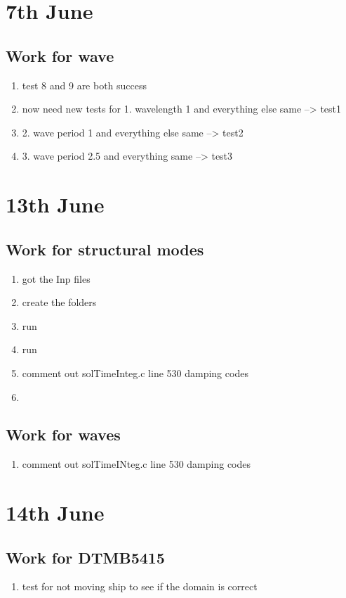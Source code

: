 \documentclass[12pt]{article} %
\begin{document}
\section{7th June}
\subsection{Work for wave}
\begin{enumerate}
    \item test 8 and 9 are both success
    \item now need new tests for 1. wavelength 1 and everything else same --> test1
    \item 2. wave period 1 and everything else same --> test2
    \item 3. wave period 2.5 and everything same --> test3
\end{enumerate}
\section{13th June}
\subsection{Work for structural modes}
\begin{enumerate}
    \item got the Inp files
    \item create the folders
    \item run %
    \item run %
    \item comment out solTimeInteg.c line 530 damping codes
    \item 
\end{enumerate}
\subsection{Work for waves}
\begin{enumerate}
\item comment out solTimeINteg.c line 530 damping codes
\end{enumerate}
\section{14th June}
\subsection{Work for DTMB5415}
\begin{enumerate}
    \item test for not moving ship to see if the domain is correct
\end{enumerate}
\end{document}
